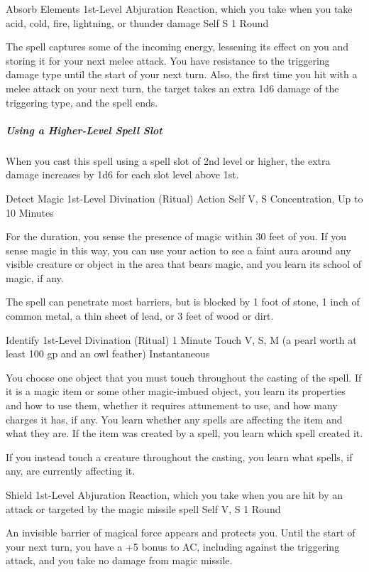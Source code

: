 \documentclass[letterpaper,openany,oneside,twocolumn]{book}
\begin{document}
\DndSpellHeader
  {Absorb Elements}
  {1st-Level Abjuration}
  {Reaction, which you take when you take acid, cold, fire, lightning, or thunder damage}
  {Self}
  {S}
  {1 Round}

The spell captures some of the incoming energy, lessening its effect on you and storing it for your next melee attack. You have resistance to the triggering damage type until the start of your next turn. Also, the first time you hit with a melee attack on your next turn, the target takes an extra 1d6 damage of the triggering type, and the spell ends.

\subparagraph*{Using a Higher-Level Spell Slot} When you cast this spell using a spell slot of 2nd level or higher, the extra damage increases by 1d6 for each slot level above 1st.

\DndSpellHeader
  {Detect Magic}
  {1st-Level Divination (Ritual)}
  {Action}
  {Self}
  {V, S}
  {Concentration, Up to 10 Minutes}

For the duration, you sense the presence of magic within 30 feet of you. If you sense magic in this way, you can use your action to see a faint aura around any visible creature or object in the area that bears magic, and you learn its school of magic, if any.

The spell can penetrate most barriers, but is blocked by 1 foot of stone, 1 inch of common metal, a thin sheet of lead, or 3 feet of wood or dirt.

\DndSpellHeader
  {Identify}
  {1st-Level Divination (Ritual)}
  {1 Minute}
  {Touch}
  {V, S, M (a pearl worth at least 100 gp and an owl feather)}
  {Instantaneous}

You choose one object that you must touch throughout the casting of the spell. If it is a magic item or some other magic-imbued object, you learn its properties and how to use them, whether it requires attunement to use, and how many charges it has, if any. You learn whether any spells are affecting the item and what they are. If the item was created by a spell, you learn which spell created it.

If you instead touch a creature throughout the casting, you learn what spells, if any, are currently affecting it.

\DndSpellHeader
  {Shield}
  {1st-Level Abjuration}
  {Reaction, which you take when you are hit by an attack or targeted by the magic missile spell}
  {Self}
  {V, S}
  {1 Round}

An invisible barrier of magical force appears and protects you. Until the start of your next turn, you have a +5 bonus to AC, including against the triggering attack, and you take no damage from magic missile.
\end{document}
